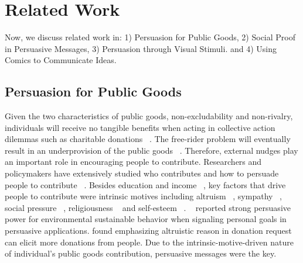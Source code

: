 \section{Related Work}
\label{sec:relatedwork}
Now, we discuss related work in: 1) Persuasion for Public Goods, 2) Social Proof in Persuasive Messages, 3) Persuasion through Visual Stimuli. and 4) Using Comics to Communicate Ideas. 

\subsection{Persuasion for Public Goods}

Given the two characteristics of public goods, non-excludability and non-rivalry, individuals will receive no tangible benefits when acting in collective action dilemmas such as charitable donations ~\cite{marwell1981economists,isaac1982public}. The free-rider problem will eventually result in an underprovision of the public goods ~\cite{marwell1981economists,marwell1979experiments,isaac1982public}. Therefore, external nudges play an important role in encouraging people to contribute. Researchers and policymakers have extensively studied who contributes and how to persuade people to contribute ~\cite{olson2009logic,becker1974theory,andreoni1990impure,miguel2005ethnic,burnett1981psychographic,pessemier1977willingness,burnett1981psychographic}. Besides education and income ~\cite{pessemier1977willingness,burnett1981psychographic}, key factors that drive people to contribute were intrinsic motives including altruism ~\cite{olson2009logic,andreoni1990impure}, sympathy ~\cite{becker1974theory}, social pressure ~\cite{miguel2005ethnic}, religiousness ~\cite{pessemier1977willingness,burnett1981psychographic} and self-esteem ~\cite{burnett1981psychographic}. ~\textcite{midden2008using} reported strong persuasive power for environmental sustainable behavior when signaling personal goals in persuasive applications. \textcite{feiler2012mixed} found emphasizing altruistic reason in donation request can elicit more donations from people. Due to the intrinsic-motive-driven nature of individual's public goods contribution, persuasive messages were the key.

